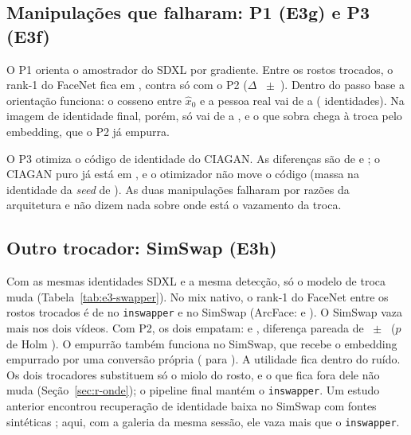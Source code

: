 \subsection{Manipulações que falharam: P1 (E3g) e P3 (E3f)}

O P1 orienta o amostrador do SDXL por gradiente. Entre os rostos trocados, o rank-1 do FaceNet fica em , contra  só com o P2 ($\Delta$ ~$\pm$~). Dentro do passo base a orientação funciona: o cosseno entre $\hat{x}_0$ e a pessoa real vai de  a  ( identidades). Na imagem de identidade final, porém, só vai de  a , e o que sobra chega à troca pelo embedding, que o P2 já empurra.

O P3 otimiza o código de identidade do CIAGAN. As diferenças são de  e ; o CIAGAN puro já está em , e o otimizador não move o código (massa na identidade da \emph{seed} de ). As duas manipulações falharam por razões da arquitetura e não dizem nada sobre onde está o vazamento da troca.

\subsection{Outro trocador: SimSwap (E3h)}

Com as mesmas identidades SDXL e a mesma detecção, só o modelo de troca muda (Tabela~\ref{tab:e3-swapper}). No mix nativo, o rank-1 do FaceNet entre os rostos trocados é de  no \texttt{inswapper} e  no SimSwap (ArcFace:  e ). O SimSwap vaza mais nos dois vídeos. Com P2, os dois empatam:  e , diferença pareada de ~$\pm$~ ($p$ de Holm ). O empurrão também funciona no SimSwap, que recebe o embedding empurrado por uma conversão própria ( para ). A utilidade fica dentro do ruído. Os dois trocadores substituem só o miolo do rosto, e o que fica fora dele não muda (Seção~\ref{sec:r-onde}); o pipeline final mantém o \texttt{inswapper}. Um estudo anterior encontrou recuperação de identidade baixa no SimSwap com fontes sintéticas \citep{mustu}; aqui, com a galeria da mesma sessão, ele vaza mais que o \texttt{inswapper}.


